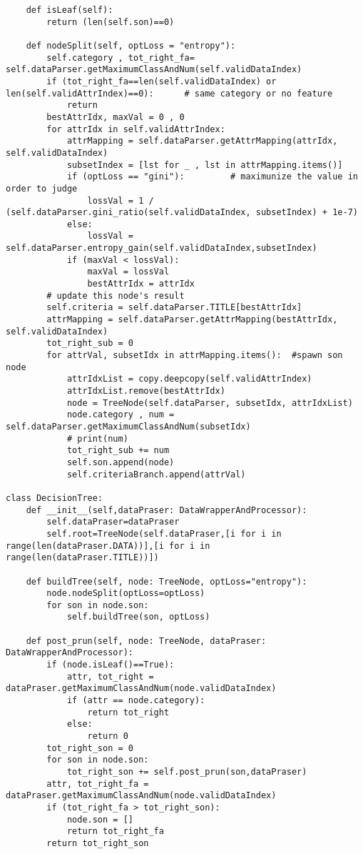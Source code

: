 \documentclass{ctexart}
\begin{document}
\begin{lstlisting}
    def isLeaf(self):
        return (len(self.son)==0)

    def nodeSplit(self, optLoss = "entropy"):
        self.category , tot_right_fa= self.dataParser.getMaximumClassAndNum(self.validDataIndex)
        if (tot_right_fa==len(self.validDataIndex) or len(self.validAttrIndex)==0):      # same category or no feature
            return
        bestAttrIdx, maxVal = 0 , 0
        for attrIdx in self.validAttrIndex:
            attrMapping = self.dataParser.getAttrMapping(attrIdx, self.validDataIndex)
            subsetIndex = [lst for _ , lst in attrMapping.items()]
            if (optLoss == "gini"):         # maximunize the value in order to judge
                lossVal = 1 / (self.dataParser.gini_ratio(self.validDataIndex, subsetIndex) + 1e-7)
            else:
                lossVal = self.dataParser.entropy_gain(self.validDataIndex,subsetIndex)
            if (maxVal < lossVal):
                maxVal = lossVal
                bestAttrIdx = attrIdx
        # update this node's result
        self.criteria = self.dataParser.TITLE[bestAttrIdx]
        attrMapping = self.dataParser.getAttrMapping(bestAttrIdx, self.validDataIndex)
        tot_right_sub = 0
        for attrVal, subsetIdx in attrMapping.items():  #spawn son node
            attrIdxList = copy.deepcopy(self.validAttrIndex)
            attrIdxList.remove(bestAttrIdx)
            node = TreeNode(self.dataParser, subsetIdx, attrIdxList)
            node.category , num = self.dataParser.getMaximumClassAndNum(subsetIdx)
            # print(num)
            tot_right_sub += num
            self.son.append(node)
            self.criteriaBranch.append(attrVal)
    
class DecisionTree:
    def __init__(self,dataPraser: DataWrapperAndProcessor):
        self.dataPraser=dataPraser
        self.root=TreeNode(self.dataPraser,[i for i in range(len(dataPraser.DATA))],[i for i in range(len(dataPraser.TITLE))])
        
    def buildTree(self, node: TreeNode, optLoss="entropy"):
        node.nodeSplit(optLoss=optLoss)
        for son in node.son:
            self.buildTree(son, optLoss)
    
    def post_prun(self, node: TreeNode, dataPraser: DataWrapperAndProcessor):
        if (node.isLeaf()==True):
            attr, tot_right = dataPraser.getMaximumClassAndNum(node.validDataIndex)
            if (attr == node.category):
                return tot_right
            else: 
                return 0
        tot_right_son = 0
        for son in node.son:
            tot_right_son += self.post_prun(son,dataPraser)
        attr, tot_right_fa = dataPraser.getMaximumClassAndNum(node.validDataIndex)
        if (tot_right_fa > tot_right_son):
            node.son = []
            return tot_right_fa
        return tot_right_son


\end{lstlisting}
\end{document}
